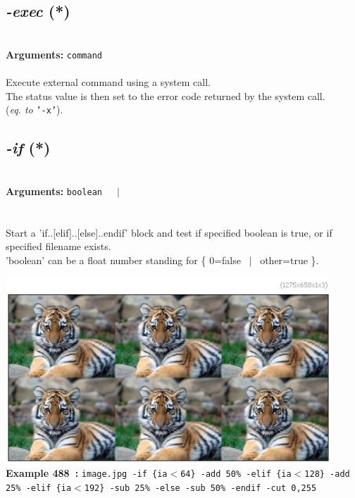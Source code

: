 \documentclass[a4paper,11pt,twoside]{book}
\begin{document}
\subsection{\emph{-exec} (*)}\vspace*{-0.5em}
~\\\textbf{Arguments: } 
{\small \texttt{command}}\\~\\
Execute external command using a system call.
~\\The status value is then set to the error code returned by the system call.
~\\(\emph{eq. to} {\small \texttt{'-x'}}).


\subsection{\emph{-if} (*)}\vspace*{-0.5em}
~\\\textbf{Arguments: } 
{\small \texttt{boolean}}~~~$|$\\
\\~\\
Start a 'if..[elif]..[else]..endif' block and test if specified boolean is true,
or if specified filename exists.
~\\'boolean' can be a float number standing for \{ 0=false ~$|$~ other=true \}.
\begin{center}\includegraphics[keepaspectratio=true,height=7cm,width=\textwidth]{img/gmic_def488.jpg}\\
{\footnotesize \textbf{Example 488~:} \texttt{image.jpg -if \{ia$<$64\} -add 50\% -elif \{ia$<$128\} -add 25\% -elif \{ia$<$192\} -sub 25\% -else -sub 50\% -endif -cut 0,255}}
\end{center}
\end{document}

